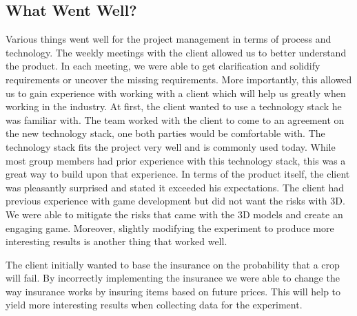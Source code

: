 \documentclass{article}
\begin{document}
\subsection{What Went Well?}
Various things went well for the project management in terms of process and technology. The weekly meetings with the client allowed us to better understand the product. In each meeting, we were able to get clarification and solidify requirements or uncover the missing requirements. More importantly, this allowed us to gain experience with working with a client which will help us greatly when working in the industry. At first, the client wanted to use a technology stack he was familiar with. The team worked with the client to come to an agreement on the new technology stack, one both parties would be comfortable with. The technology stack fits the project very well and is commonly used today. While most group members had prior experience with this technology stack, this was a great way to build upon that experience. In terms of the product itself, the client was pleasantly surprised and stated it exceeded his expectations. The client had previous experience with game development but did not want the risks with 3D. We were able to mitigate the risks that came with the 3D models and create an engaging game. Moreover, slightly modifying the experiment to produce more interesting results is another thing that worked well.

The client initially wanted to base the insurance on the probability that a crop will fail. By incorrectly implementing the insurance we were able to change the way insurance works by insuring items based on future prices. This will help to yield more interesting results when collecting data for the experiment. 
\end{document}
